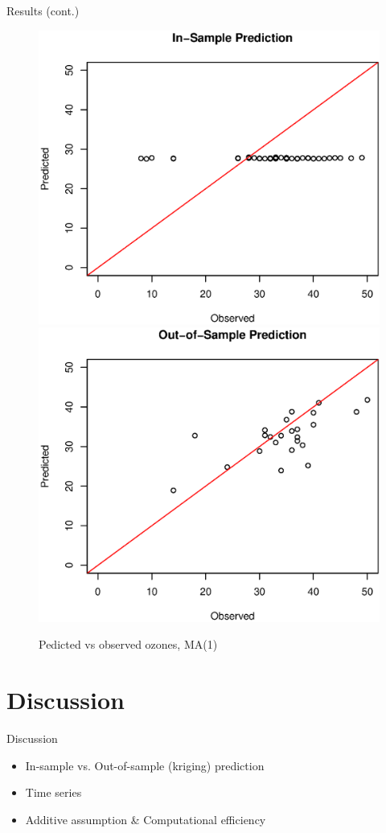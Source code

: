 \documentclass{beamer}
\begin{document}
\begin{frame}{Results (cont.)}
\begin{figure}
\centering
\includegraphics[scale = 0.35]{pred_in_ma.eps}
\includegraphics[scale = 0.35]{pred_out_ma.eps}
\caption{Pedicted vs observed ozones, MA(1)}
\end{figure}
\end{frame}


\section{Discussion}

\begin{frame}{Discussion}
\begin{itemize}
	\item In-sample vs. Out-of-sample (kriging) prediction
    \item Time series
    \item Additive assumption \& Computational efficiency
\end{itemize}
\end{frame}
\end{document}
